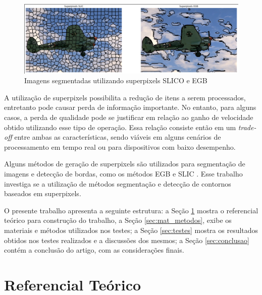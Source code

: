 \begin{document}
\begin{figure}[ht]
\centering
\includegraphics[width=1.\textwidth]{superpixels.png}
\caption{Imagens segmentadas utilizando superpixels SLICO e EGB}
\label{fig:superpixel}
\end{figure}

A utilização de superpixels possibilita a redução de itens a serem processados, entretanto pode causar perda de informação importante. No entanto, para alguns casos, a perda de qualidade pode se justificar em relação ao ganho de velocidade obtido utilizando esse tipo de operação. Essa relação consiste então em um \textit{trade-off} entre ambas as características, sendo viáveis em alguns cenários de processamento em tempo real ou para dispositivos com baixo desempenho.

Alguns métodos de geração de superpixels são utilizados para segmentação de imagens e detecção de bordas, como os métodos EGB \cite{FELZENSZWALB} e SLIC \cite{SLIC}. Esse trabalho investiga se a utilização de métodos segmentação e detecção de contornos baseados em superpixels.

O presente trabalho apresenta a seguinte estrutura: a Seção \ref{sec:ref_teorico} mostra o referencial teórico para construção do trabalho, a Seção  \ref{sec:mat_metodos}, exibe os materiais e métodos utilizados nos testes; a Seção \ref{sec:testes} mostra os resultados obtidos nos testes realizados e a discussões dos mesmos; a Seção \ref{sec:conclusao} contém a conclusão do artigo, com as considerações finais.



\section{Referencial Teórico} \label{sec:ref_teorico}

\end{document}
